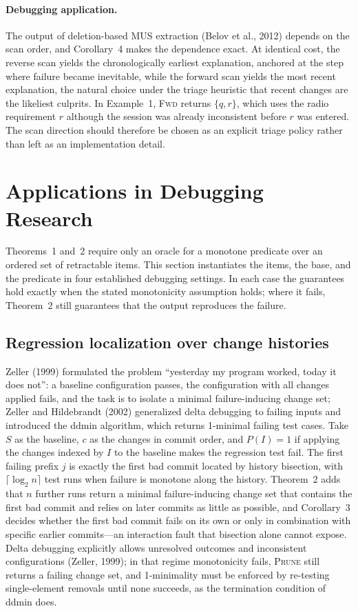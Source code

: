 \documentclass[11pt,reqno]{amsart}
\theoremstyle{plain}
\theoremstyle{definition}
\newcommand{\PRUNE}{\textsc{Prune}}
\newcommand{\FWD}{\textsc{Fwd}}
\begin{document}
\paragraph{Debugging application.} The output of deletion-based MUS extraction
(Belov et al., 2012) depends on the scan order, and Corollary~4 makes the
dependence exact. At identical cost, the reverse scan yields the chronologically
earliest explanation, anchored at the step where failure became inevitable, while
the forward scan yields the most recent explanation, the natural choice under the
triage heuristic that recent changes are the likeliest culprits. In Example~1,
\FWD{} returns $\{q,r\}$, which uses the radio requirement $r$ although the session
was already inconsistent before $r$ was entered. The scan direction should
therefore be chosen as an explicit triage policy rather than left as an
implementation detail.

\section{Applications in Debugging Research}
Theorems~1 and~2 require only an oracle for a monotone predicate over an ordered
set of retractable items. This section instantiates the items, the base, and the
predicate in four established debugging settings. In each case the guarantees hold
exactly when the stated monotonicity assumption holds; where it fails, Theorem~2
still guarantees that the output reproduces the failure.

\subsection{Regression localization over change histories}
Zeller (1999) formulated the problem ``yesterday my program worked, today it does
not'': a baseline configuration passes, the configuration with all changes applied
fails, and the task is to isolate a minimal failure-inducing change set; Zeller and
Hildebrandt (2002) generalized delta debugging to failing inputs and introduced the
ddmin algorithm, which returns 1-minimal failing test cases. Take $S$ as the
baseline, $c$ as the changes in commit order, and $P(I)=1$ if applying the changes
indexed by $I$ to the baseline makes the regression test fail. The first failing
prefix $j$ is exactly the first bad commit located by history bisection, with
$\lceil\log_2 n\rceil$ test runs when failure is monotone along the history.
Theorem~2 adds that $n$ further runs return a minimal failure-inducing change set
that contains the first bad commit and relies on later commits as little as
possible, and Corollary~3 decides whether the first bad commit fails on its own or
only in combination with specific earlier commits---an interaction fault that
bisection alone cannot expose. Delta debugging explicitly allows unresolved
outcomes and inconsistent configurations (Zeller, 1999); in that regime
monotonicity fails, \PRUNE{} still returns a failing change set, and 1-minimality
must be enforced by re-testing single-element removals until none succeeds, as the
termination condition of ddmin does.
\end{document}
